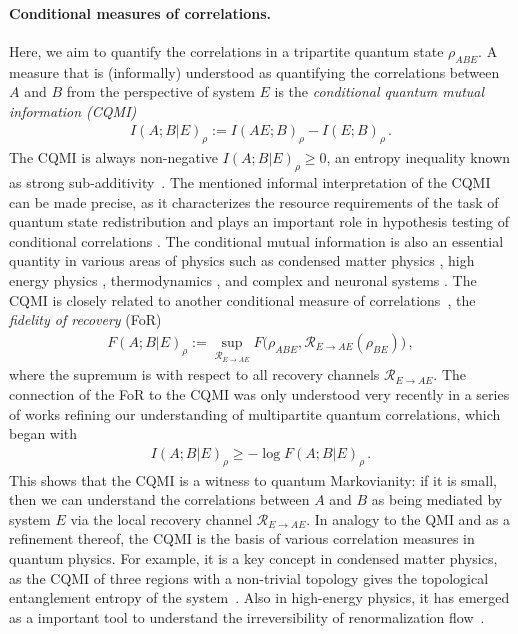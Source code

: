 \documentclass[a4paper,aps,prl,twocolumn,10pt,superscriptaddress]{revtex4-1}
\theoremstyle{plain}
\theoremstyle{definition}
\begin{document}
\paragraph{Conditional measures of correlations.} Here, we aim to quantify the correlations in a tripartite quantum state $\rho_{ABE}$. A measure that is (informally) understood as quantifying the correlations between $A$ and $B$ from the perspective of system $E$ is the {\it conditional quantum mutual information (CQMI)}
\begin{align}\label{eq:def_cqmi}
I(A;B|E)_{\rho}:=I(AE;B)_{\rho}-I(E;B)_{\rho}\,.
\end{align}
The CQMI is always non-negative $I(A;B|E)_{\rho}\geq0$, an entropy inequality known as strong sub-additivity~\cite{PhysRevLett.30.434}. The mentioned informal interpretation of the CQMI can be made precise, as it characterizes the resource requirements of the task of quantum state redistribution \cite{DY08} and plays an important role in hypothesis testing of conditional correlations \cite{Tomamichel2018,PhysRevA.94.022310,Berta2017}. The conditional mutual information is also an essential quantity in various areas of physics such as condensed matter physics \cite{Zeng2015,Kim2012}, high energy physics \cite{Pastawski2017,Czech2015}, thermodynamics \cite{Mahajan2016}, and complex and neuronal systems \cite{Bettencourt2008}. The CQMI is closely related to another conditional measure of correlations~\cite{Pet86}, the {\it fidelity of recovery} (FoR)~\cite{SW14}
\begin{align*}
F(A;B|E)_{\rho}:=\sup_{\mathcal{R}_{E\rightarrow AE}}F\big(\rho_{ABE},\mathcal{R}_{E\rightarrow AE}(\rho_{BE})\big)\,,
\end{align*}
where the supremum is with respect to all recovery channels $\mathcal{R}_{E\rightarrow AE}$. The connection of the FoR to the CQMI was only understood very recently in a series of works refining our understanding of multipartite quantum correlations, which began with \cite[Thm.~5.1]{FR14}
\begin{align}\label{eq:fawzi_renner}
I(A;B|E)_{\rho}\geq-\log F(A;B|E)_{\rho}\,.
\end{align}
This shows that the CQMI is a witness to quantum Markovianity: if it is small, then we can understand the correlations between $A$ and $B$ as being mediated by system $E$ via the local recovery channel $\mathcal{R}_{E\rightarrow AE}$. In analogy to the QMI and as a refinement thereof, the CQMI is the basis of various correlation measures in quantum physics. For example, it is a key concept in condensed matter physics, as the CQMI of three regions with a non-trivial topology gives the topological entanglement entropy of the system~\cite{LW06,PK06}. Also in high-energy physics, it has emerged as a important tool to understand the irreversibility of renormalization flow~\cite{L17}. 
\end{document}
